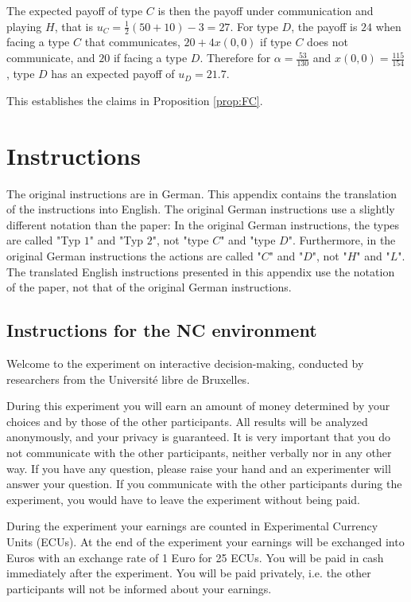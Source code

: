 \documentclass[12pt]{article}
\theoremstyle{break}
\begin{document}
The expected payoff of type $C$ is then the payoff under communication and playing $H$, that is $u_C=\frac{1}{2}(50+10)-3=27$. For type $D$, the payoff is $24$ when facing a type $C$ that communicates, $20+4x(0,0)$ if type $C$ does not communicate, and $20$ if facing a type $D$. Therefore for $\alpha=\frac{53}{130}$ and $x(0,0)=\frac{115}{154}$, type $D$ has an expected payoff of $u_D=21.7$.
%


This establishes the claims in Proposition \ref{prop:FC}.

%   
%    
\newpage
\section{Instructions}

The original instructions are in German. This appendix contains the translation of the instructions into English. The original German instructions use a slightly different notation than the paper: In the original German instructions, the types are called "Typ $1$" and "Typ $2$", not "type $C$" and "type $D$". Furthermore, in the original German instructions the actions are called "$C$" and "$D$", not "$H$" and "$L$". The translated English instructions presented in this appendix use the notation of the paper, not that of the original German instructions.

\subsection{Instructions for the NC environment}

Welcome to the experiment on interactive decision-making, conducted by researchers from the Universit\'e libre de Bruxelles.

During this experiment you will earn an amount of money determined by your choices and by those of the other participants. All results will be analyzed anonymously, and your privacy is guaranteed. It is very important that you do not communicate with the other participants, neither verbally nor in any other way. If you have any question, please raise your hand and an experimenter will answer your question. If you communicate with the other participants during the experiment, you would have to leave the experiment without being paid. 

During the experiment your earnings are counted in Experimental Currency Units (ECUs). At the end of the experiment your earnings will be exchanged into Euros with an exchange rate of 1 Euro for 25 ECUs. You will be paid in cash immediately after the experiment. You will be paid privately, i.e. the other participants will not be informed about your earnings.
\end{document}
